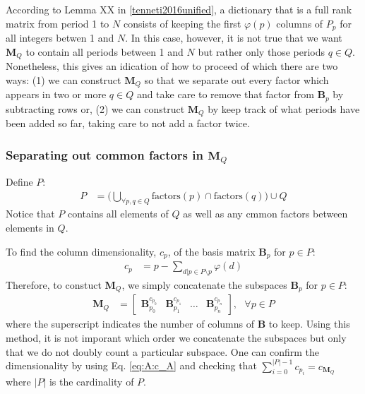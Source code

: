     According to Lemma XX in \ref{tenneti2016unified}, a dictionary that is a full rank matrix from period 1 to $N$ consists of keeping the first $\varphi(p)$ columns of $P_p$ for all integers betwen 1 and $N$. In this case, however, it is not true that we want $\bm{M}_Q$ to contain all periods between 1 and $N$ but rather only those periods $q \in Q$. Nonetheless, this gives an idication of how to proceed of which there are two ways: (1) we can construct $\bm{M}_Q$ so that we separate out every factor which appears in two or more $q \in Q$ and take care to remove that factor from $\bm{B}_p$ by subtracting rows or, (2) we can construct $\bm{M}_Q$ by keep track of what periods have been added so far, taking care to not add a factor twice.

    \subsubsection{Separating out common factors in $\bm{M}_Q$}\label{detection:A:separateFactors}
        Define $P$:
        \begin{align}\label{eq:A:commonFactors:P}
            P &= \Bigg( \bigcup_{\forall p, q \in Q} \text{factors}(p) \cap \text{factors}(q) \Bigg) \cup Q
        \end{align}
        Notice that $P$ contains all elements of $Q$ as well as any cmmon factors between elements in $Q$.

        To find the column dimensionality, $c_{p}$, of the basis matrix $\bm{B}_p$ for $p \in P$:
        \begin{align}\label{eq:A:commonFactors:cp}
            c_{p} &= p - \sum_{d|p \in P \setminus p} \varphi(d)
        \end{align}
        Therefore, to constuct $\bm{M}_Q$, we simply concatenate the subspaces $\bm{B}_p$ for $p \in P$:
        \begin{align}\label{eq:A:commonFactors:A}
            \bm{M}_Q &= \begin{bmatrix}
                    \bm{B}_{p_0}^{c_{p_0}} &
                    \bm{B}_{p_1}^{c_{p_1}} &
                    \hdots &
                    \bm{B}_{p_n}^{c_{p_n}}
                \end{bmatrix}
                , \text{ } \forall p \in P
        \end{align}
        where the superscript indicates the number of columns of $\bm{B}$ to keep. Using this method, it is not imporant which order we concatenate the subspaces but only that we do not doubly count a particular subspace. One can confirm the dimensionality by using Eq. \eqref{eq:A:c_A} and checking that $\sum_{i = 0}^{|P| - 1} c_{p_i} = c_{\bm{M}_Q}$ where $|P|$ is the cardinality of $P$.

